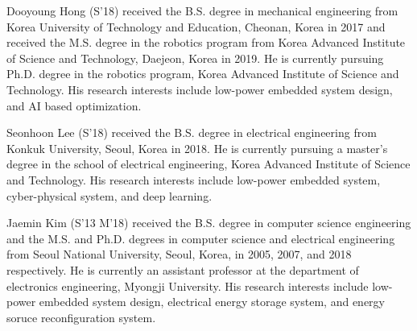 \documentclass[journal]{./template/IEEEtran}
\begin{document}


\begin{IEEEbiography}{Dooyoung Hong}
(S'18) received the B.S. degree in mechanical engineering from Korea University of Technology and Education, Cheonan, Korea in 2017 and received the M.S. degree in the robotics program from Korea Advanced Institute of Science and Technology, Daejeon, Korea in 2019. He is currently pursuing Ph.D. degree in the robotics program, Korea Advanced Institute of Science and Technology. His research interests include low-power embedded system design, and AI based optimization.
\end{IEEEbiography}

\begin{IEEEbiography}{Seonhoon Lee}
(S'18) received the B.S. degree in electrical engineering from Konkuk University, Seoul, Korea in 2018. He is currently pursuing a master’s degree in the school of electrical engineering, Korea Advanced Institute of Science and Technology. His research interests include low-power embedded system, cyber-physical system, and deep learning.
\end{IEEEbiography}

\begin{IEEEbiography}{Jaemin Kim}
(S'13 M'18) received the B.S. degree in computer science engineering and the M.S. and Ph.D. degrees in computer science and electrical engineering from Seoul National University, Seoul, Korea, in 2005, 2007, and 2018 respectively. He is currently an assistant professor at the department of electronics engineering, Myongji University. His research interests include low-power embedded system design, electrical energy storage system, and energy soruce reconfiguration system.
\end{IEEEbiography}
\end{document}
